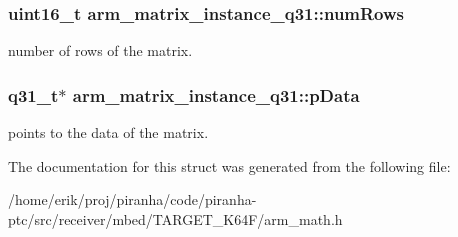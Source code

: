 \subsubsection[{\texorpdfstring{num\+Rows}{numRows}}]{\setlength{\rightskip}{0pt plus 5cm}uint16\+\_\+t arm\+\_\+matrix\+\_\+instance\+\_\+q31\+::num\+Rows}\hypertarget{structarm__matrix__instance__q31_a63bacac158a821c8cfc06088d251598c}{}\label{structarm__matrix__instance__q31_a63bacac158a821c8cfc06088d251598c}
number of rows of the matrix. 
\subsubsection[{\texorpdfstring{p\+Data}{pData}}]{\setlength{\rightskip}{0pt plus 5cm}q31\+\_\+t$\ast$ arm\+\_\+matrix\+\_\+instance\+\_\+q31\+::p\+Data}\hypertarget{structarm__matrix__instance__q31_a09a64267c0579fef086efc9059741e56}{}\label{structarm__matrix__instance__q31_a09a64267c0579fef086efc9059741e56}
points to the data of the matrix. 

The documentation for this struct was generated from the following file\+:\begin{DoxyCompactItemize}
\item 
/home/erik/proj/piranha/code/piranha-\/ptc/src/receiver/mbed/\+T\+A\+R\+G\+E\+T\+\_\+\+K64\+F/arm\+\_\+math.\+h\end{DoxyCompactItemize}
